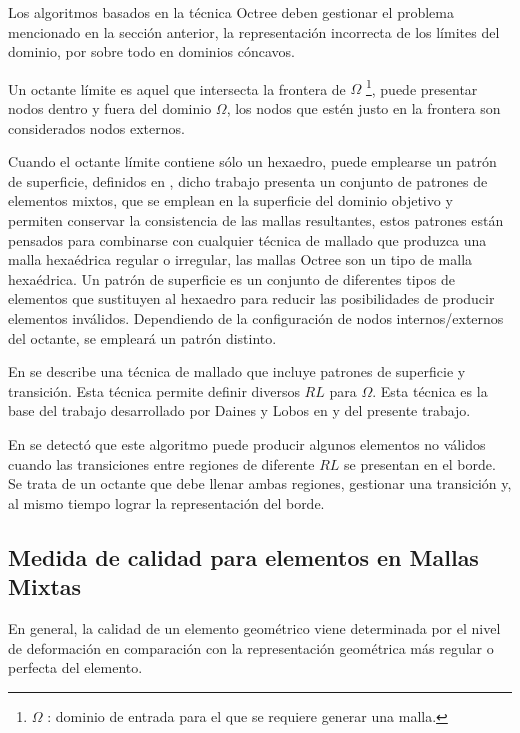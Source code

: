 
Los algoritmos basados en la técnica Octree deben gestionar el problema mencionado en la sección anterior, la representación incorrecta de los límites del dominio, por sobre todo en dominios cóncavos.

Un octante límite es aquel que intersecta la frontera de $\Omega$ \footnote{$\Omega$ : dominio de entrada para el que se requiere generar una malla.}, puede presentar nodos dentro y fuera del dominio $\Omega$, los nodos que estén justo en la frontera son considerados nodos externos.

Cuando el octante límite contiene sólo un hexaedro, puede emplearse un patrón de superficie, definidos en \cite{lobos2013patterns}, dicho trabajo presenta un conjunto de patrones de elementos mixtos, que se emplean en la superficie del dominio objetivo y permiten conservar la consistencia de las mallas resultantes, estos patrones están pensados para combinarse con cualquier técnica de mallado que produzca una malla hexaédrica regular o irregular, las mallas Octree son un tipo de malla hexaédrica. Un patrón de superficie es un conjunto de diferentes tipos de elementos que sustituyen al hexaedro para reducir las posibilidades de producir elementos inválidos. Dependiendo de la configuración de nodos internos/externos del octante, se empleará un patrón distinto.

En \cite{lobos2015mixed} se describe una técnica de mallado que incluye patrones de superficie y transición. Esta técnica permite definir diversos $RL$ para $\Omega$. Esta técnica es la base del trabajo desarrollado por Daines y Lobos en \cite{daines2018repairing} y del presente trabajo.

En \cite{daines2018repairing} se detectó que este algoritmo puede producir algunos elementos no válidos cuando las transiciones entre regiones de diferente $RL$ se presentan en el borde. Se trata de un octante que debe llenar ambas regiones, gestionar una transición y, al mismo tiempo lograr la representación del borde. 

\subsection{Medida de calidad para elementos en Mallas Mixtas}

En general, la calidad de un elemento geométrico viene determinada por el nivel de deformación en comparación con la representación geométrica más regular o perfecta del elemento.

